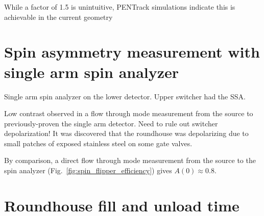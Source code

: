 While a factor of 1.5 is unintuitive, PENTrack simulations indicate this is achievable in the current geometry


\section{Spin asymmetry measurement with single arm spin analyzer}


Single arm spin analyzer on the lower detector. Upper switcher had the SSA. 

Low contrast observed in a flow through mode measurement from the source to previously-proven the single arm detector. Need to rule out switcher depolarization! It was discovered that the roundhouse was depolarizing due to small patches of exposed stainless steel on some gate valves. 

 By comparison, a direct flow through mode measurement from the \ucn source to the spin analyzer (Fig.~\ref{fig:spin_flipper_efficiency}) gives $A(0)\approx 0.8$.



\section{Roundhouse fill and unload time }



\begin{figure}

\end{figure}


